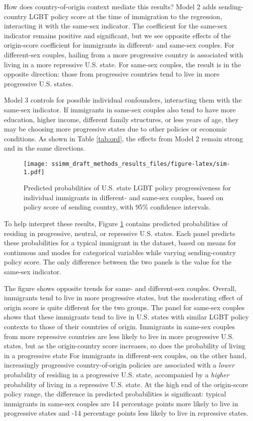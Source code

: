 \documentclass[
  11pt,
]{article}
\begin{document}
How does country-of-origin context mediate this results? Model 2 adds sending-country LGBT policy score at the time of immigration to the regression, interacting it with the same-sex indicator. The coefficient for the same-sex indicator remains positive and significant, but we see opposite effects of the origin-score coefficient for immigrants in different- and same-sex couples. For different-sex couples, hailing from a more progressive country is associated with living in a more repressive U.S. state. For same-sex couples, the result is in the opposite direction: those from progressive countries tend to live in more progressive U.S. states.

Model 3 controls for possible individual confounders, interacting them with the same-sex indicator. If immigrants in same-sex couples also tend to have more education, higher income, different family structures, or less years of age, they may be choosing more progressive states due to other policies or economic conditions. As shown in Table \ref{tab:ord}, the effects from Model 2 remain strong and in the same directions.

\begin{figure}
\centering
\texttt{[image: ssimm\_draft\_methods\_results\_files/figure-latex/sim-1.pdf]}
\caption{\label{fig:sim}Predicted probabilities of U.S. state LGBT policy progressiveness for individual immigrants in different- and same-sex couples, based on policy score of sending country, with 95\% confidence intervals.}
\end{figure}

To help interpret these results, Figure \ref{fig:sim} contains predicted probabilities of residing in progressive, neutral, or repressive U.S. states. Each panel predicts these probabilities for a typical immigrant in the dataset, based on means for continuous and modes for categorical variables while varying sending-country policy score. The only difference between the two panels is the value for the same-sex indicator.

The figure shows opposite trends for same- and different-sex couples. Overall, immigrants tend to live in more progressive states, but the moderating effect of origin score is quite different for the two groups. The panel for same-sex couples shows that these immigrants tend to live in U.S. states with similar LGBT policy contexts to those of their countries of origin. Immigrants in same-sex couples from more repressive countries are less likely to live in more progressive U.S. states, but as the origin-country score increases, so does the probability of living in a progressive state For immigrants in different-sex couples, on the other hand, increasingly progressive country-of-origin policies are associated with a \emph{lower} probability of residing in a progressive U.S. state, accompanied by a \emph{higher} probability of living in a repressive U.S. state. At the high end of the origin-score policy range, the difference in predicted probabilities is significant: typical immigrants in same-sex couples are 14 percentage points more likely to live in progressive states and -14 percentage points less likely to live in repressive states.
\end{document}
